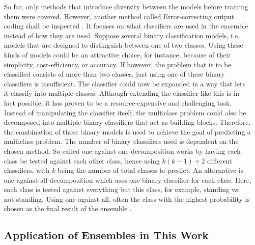 So far, only methods that introduce diversity between the models before training them were covered. However, another method called Error-correcting output coding shall be inspected \cite{rokach2010}. It focuses on what classifiers are used in the ensemble instead of how they are used. Suppose several binary classification models, i.e. models that are designed to distinguish between one of two classes. Using these kinds of models could be an attractive choice, for instance, because of their simplicity, cost-efficiency, or accuracy. If however, the problem that is to be classified consists of more than two classes, just using one of these binary classifiers is insufficient. The classifier could now be expanded in a way that lets it classify into multiple classes. Although extending the classifier like this is in fact possible, it has proven to be a resource-expensive and challenging task. Instead of manipulating the classifier itself, the multiclass problem could also be decomposed into multiple binary classifiers that act as building blocks. Therefore, the combination of those binary models is used to achieve the goal of predicting a multiclass problem. The number of binary classifiers used is dependent on the chosen method. So-called one-against-one decomposition works by having each class be tested against each other class, hence using $k(k-1)\div 2$ different classifiers, with $k$ being the number of total classes to predict. An alternative is one-against-all decomposition which uses one binary classifier for each class. Here, each class is tested against everything but this class, for example, standing vs. not standing. Using one-against-all, often the class with the highest probability is chosen as the final result of the ensemble \cite{rokach2010}. 


\subsection{Application of Ensembles in This Work}

